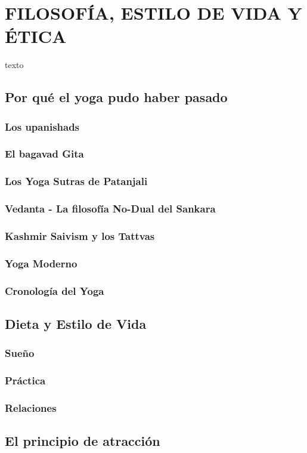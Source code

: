 \chapter{FILOSOFÍA, ESTILO DE VIDA Y ÉTICA}
texto
\section{Por qué el yoga pudo haber pasado}
\subsection{Los upanishads}
\subsection{El bagavad Gita}
\subsection{Los Yoga Sutras de Patanjali}
\subsection{Vedanta - La filosofía No-Dual del Sankara}
\subsection{Kashmir Saivism y los Tattvas}
\subsection{Yoga Moderno}
\subsection{Cronología del Yoga}
\section{Dieta y Estilo de Vida}
\subsection{Sueño}
\subsection{Práctica}
\subsection{Relaciones}
\section{El principio de atracción}
